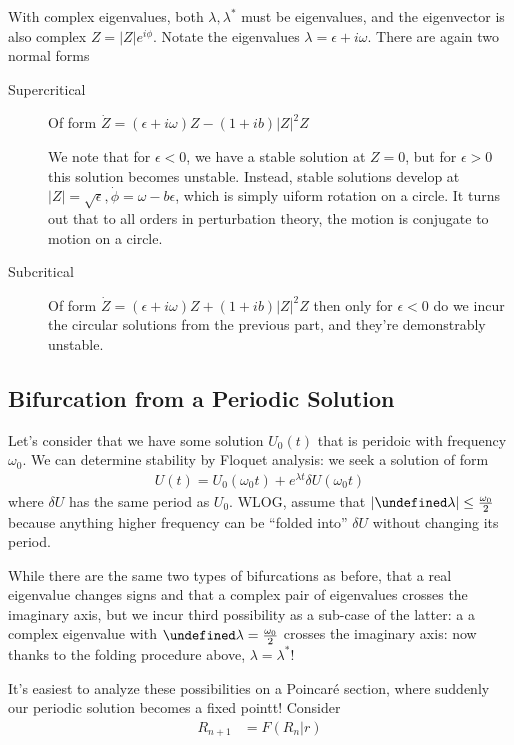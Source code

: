 \documentclass[12pt]{article}
\newcommand{\abs}[1]{\left|#1\right|}
\let\Im\undefined
\DeclareMathOperator{\Im}{Im}
\begin{document}
With complex eigenvalues, both $\lambda, \lambda^*$ must be eigenvalues, and the
eigenvector is also complex $Z = \abs{Z}e^{i\phi}$. Notate the eigenvalues
$\lambda = \epsilon + i\omega$. There are again two normal forms
\begin{description}
    \item[Supercritical] Of form
        $\dot{Z} = (\epsilon + i\omega)Z - (1 + ib)\abs{Z}^2Z$

        We note that for $\epsilon < 0$, we have a stable solution at $Z=0$, but
        for $\epsilon > 0$ this solution becomes unstable. Instead, stable
        solutions develop at $\abs{Z} = \sqrt{\epsilon}, \dot{\phi} = \omega -
        b\epsilon$, which is simply uiform rotation on a circle. It turns out
        that to all orders in perturbation theory, the motion is conjugate to
        motion on a circle.
    \item[Subcritical] Of form
        $\dot{Z} = (\epsilon + i\omega)Z + (1 + ib)\abs{Z}^2Z$
        then only for $\epsilon < 0$ do we incur the circular solutions from the
        previous part, and they're demonstrably unstable.
\end{description}

\subsection{Bifurcation from a Periodic Solution}

Let's consider that we have some solution $U_0(t)$ that is peridoic with frequency
$\omega_0$. We can determine stability by Floquet analysis: we seek a solution
of form
\begin{align}
    U(t) = U_0(\omega_0t) + e^{\lambda t}\delta U(\omega_0 t)
\end{align}
where $\delta U$ has the same period as $U_0$. WLOG, assume that
$\abs{\Im \lambda} \leq \frac{\omega_0}{2}$
because anything higher frequency can be ``folded into'' $\delta U$ without
changing its period.

While there are the same two types of bifurcations as before, that a real
eigenvalue changes signs and that a complex pair of eigenvalues crosses the
imaginary axis, but we incur third possibility as a sub-case of the latter: a
a complex eigenvalue with $\Im \lambda = \frac{\omega_0}{2}$ crosses the
imaginary axis: now thanks to the folding procedure above, $\lambda =
\lambda^*$!

It's easiest to analyze these possibilities on a Poincar\'e section, where
suddenly our periodic solution becomes a fixed pointt! Consider
\begin{align}
    R_{n+1} &= F(R_n|r)
\end{align}
\end{document}
